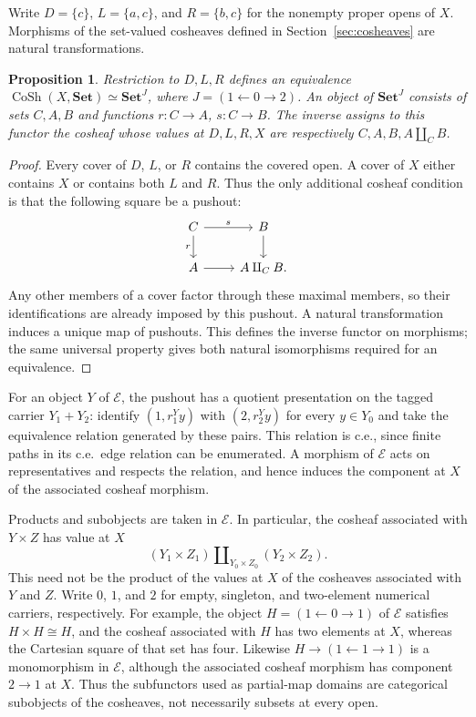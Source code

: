 \documentclass[11pt]{article}
\newtheorem{proposition}[theorem]{Proposition}
\begin{document}
Write $D=\{c\}$, $L=\{a,c\}$, and $R=\{b,c\}$ for the nonempty
proper opens of $X$. Morphisms of the set-valued cosheaves defined in
Section~\ref{sec:cosheaves} are natural transformations.

\begin{proposition}\label{prop:fork-cosheaves}
Restriction to $D,L,R$ defines an equivalence
$\operatorname{CoSh}(X,\mathbf{Set})\simeq\mathbf{Set}^{J}$,
where $J=(1\leftarrow0\to2)$. An object of $\mathbf{Set}^{J}$
consists of sets $C,A,B$ and functions $r:C\to A$, $s:C\to B$.
The inverse assigns to this functor the cosheaf whose values at
$D,L,R,X$ are respectively $C,A,B,A\amalg_C B$.
\end{proposition}
\begin{proof}
Every cover of $D$, $L$, or $R$ contains the covered open. A cover
of $X$ either contains $X$ or contains both $L$ and $R$. Thus the
only additional cosheaf condition is that the following square be
a pushout:
\[
\begin{tikzcd}
C\arrow[r,"s"]\arrow[d,"r"']&B\arrow[d]\\
A\arrow[r]&A\amalg_C B.
\end{tikzcd}
\]
Any other members of a cover factor through these maximal members,
so their identifications are already imposed by this pushout.
A natural transformation induces a unique map of pushouts.
This defines the inverse functor on morphisms; the same universal
property gives both natural isomorphisms required for an equivalence.
\end{proof}

For an object $Y$ of $\mathcal E$, the pushout has a
quotient presentation on the tagged carrier $Y_1+Y_2$: identify
$(1,r_1^Yy)$ with $(2,r_2^Yy)$ for every $y\in Y_0$ and take the
equivalence relation generated by these pairs. This relation is c.e.,
since finite paths in its c.e.\ edge relation can be enumerated.
A morphism of $\mathcal E$ acts on representatives and respects the
relation, and hence induces the component at $X$ of the associated
cosheaf morphism.

Products and subobjects are taken in $\mathcal E$. In
particular, the cosheaf associated with $Y\times Z$ has value at $X$
\[
 (Y_1\times Z_1)\amalg_{Y_0\times Z_0}(Y_2\times Z_2).
\]
This need not be the product of the values at $X$ of
the cosheaves associated with $Y$ and $Z$. Write $0$, $1$, and $2$
for empty, singleton, and two-element numerical carriers, respectively.
For example,
the object $H=(1\leftarrow0\to1)$ of $\mathcal E$ satisfies
$H\times H\cong H$,
and the cosheaf associated with $H$ has two elements at $X$,
whereas the Cartesian square of that set has four.
Likewise $H\to(1\leftarrow1\to1)$ is a monomorphism in $\mathcal E$,
although the associated cosheaf morphism has component $2\to1$ at $X$.
Thus the
subfunctors used as partial-map domains are categorical subobjects
of the cosheaves, not necessarily subsets at every open.
\end{document}
